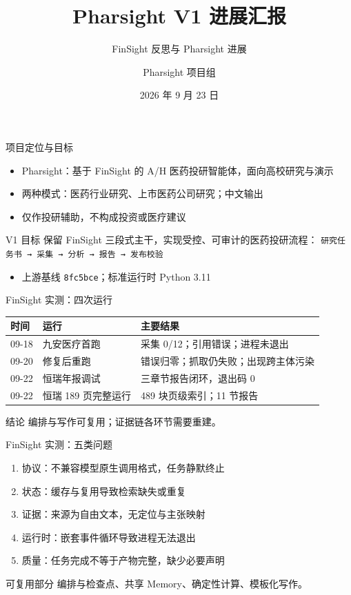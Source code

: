 \documentclass[aspectratio=169,10pt]{ctexbeamer}
\title{Pharsight V1 进展汇报}
\subtitle{FinSight 反思与 Pharsight 进展}
\author{Pharsight 项目组}
\date{2026 年 9 月 23 日}
\begin{document}
\maketitle

\begin{frame}{项目定位与目标}
\begin{itemize}
  \item Pharsight：基于 FinSight 的 A/H 医药投研智能体，面向高校研究与演示
  \item 两种模式：医药行业研究、上市医药公司研究；中文输出
  \item 仅作投研辅助，不构成投资或医疗建议
\end{itemize}
\begin{block}{V1 目标}
保留 FinSight 三段式主干，实现受控、可审计的医药投研流程：
\texttt{研究任务书 → 采集 → 分析 → 报告 → 发布校验}
\end{block}
\begin{itemize}
  \item 上游基线 \texttt{8fc5bce}；标准运行时 Python 3.11
\end{itemize}
\end{frame}

\begin{frame}{FinSight 实测：四次运行}
\centering
\small
\begin{tabular}{lll}
\toprule
时间 & 运行 & 主要结果 \\
\midrule
09-18 & 九安医疗首跑 & 采集 0/12；引用错误；进程未退出 \\
09-20 & 修复后重跑 & 错误归零；抓取仍失败；出现跨主体污染 \\
09-22 & 恒瑞年报调试 & 三章节报告闭环，退出码 0 \\
09-22 & 恒瑞 189 页完整运行 & 489 块页级索引；11 节报告 \\
\bottomrule
\end{tabular}
\vspace{0.8em}
\begin{block}{结论}
编排与写作可复用；证据链各环节需要重建。
\end{block}
\end{frame}

\begin{frame}{FinSight 实测：五类问题}
\begin{enumerate}
  \item \alert{协议}：不兼容模型原生调用格式，任务静默终止
  \item \alert{状态}：缓存与复用导致检索缺失或重复
  \item \alert{证据}：来源为自由文本，无定位与主张映射
  \item \alert{运行时}：嵌套事件循环导致进程无法退出
  \item \alert{质量}：任务完成不等于产物完整，缺少必要声明
\end{enumerate}
\begin{exampleblock}{可复用部分}
编排与检查点、共享 Memory、确定性计算、模板化写作。
\end{exampleblock}
\end{frame}
\end{document}
